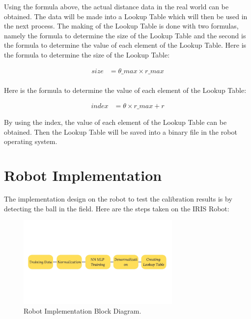 Using the formula above, the actual distance data in the real world can be obtained. The data will be made into a Lookup Table which will then be used in the next process. The making of the Lookup Table is done with two formulas, namely the formula to determine the size of the Lookup Table and the second is the formula to determine the value of each element of the Lookup Table. Here is the formula to determine the size of the Lookup Table:

\begin{equation}
  \begin{aligned}
    size &= \theta\_max \times r\_max \\
  \end{aligned}
\end{equation}

Here is the formula to determine the value of each element of the Lookup Table: 

\begin{equation}
  \begin{aligned}
    index &= \theta \times r\_max + r
  \end{aligned}
\end{equation}

By using the index, the value of each element of the Lookup Table can be obtained. Then the Lookup Table will be saved into a binary file in the robot operating system.


\section{Robot Implementation}
\label{sec:desaindanimplementasi2}

The implementation design on the robot to test the calibration results is by detecting the ball in the field. Here are the steps taken on the IRIS Robot: 

\begin{figure}[H]
  \centering
  \includegraphics[width=8cm]{gambar/anu3.jpg}
  \caption{Robot Implementation Block Diagram.}
  \label{fig:diag33}
\end{figure}


